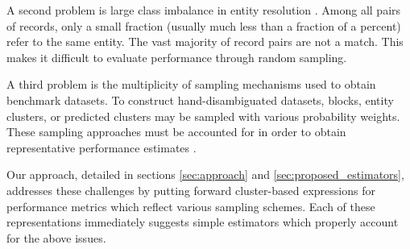 \documentclass[fontsize=11pt]{article}
\theoremstyle{definition}
\begin{document}
A second problem is large class imbalance in entity resolution \citep{Marchant2017}. Among all pairs of records, only a small fraction (usually much less than a fraction of a percent) refer to the same entity. The vast majority of record pairs are not a match. This makes it difficult to evaluate performance through random sampling.

A third problem is the multiplicity of sampling mechanisms used to obtain benchmark datasets. To construct hand-disambiguated datasets, blocks, entity clusters, or predicted clusters may be sampled with various probability weights. These sampling approaches must be accounted for in order to obtain representative performance estimates \citep{fuller2011sampling}.

Our approach, detailed in sections \ref{sec:approach} and \ref{sec:proposed_estimators}, addresses these challenges by putting forward cluster-based expressions for performance metrics which reflect various sampling schemes. Each of these representations immediately suggests simple estimators which properly account for the above issues.
\end{document}
